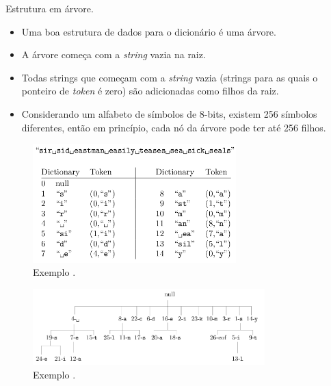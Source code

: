 \begin{frame}[allowframebreaks]
  \framebreak
  Estrutura em árvore.
  \begin{itemize}
  \item Uma boa estrutura de dados para o dicionário é uma árvore.
  \item A árvore começa com a \textit{string} vazia na raiz.
  \item Todas strings que começam com a \textit{string} vazia (strings para as quais o ponteiro de \textit{token} é zero) são adicionadas
        como filhos da raiz.
  \item Considerando um alfabeto de símbolos de 8-bits, existem 256 símbolos diferentes, então em princípio, cada nó
        da árvore pode ter até 256 filhos.
  \end{itemize} 

  \framebreak

  \begin{figure}[h!]
  \centering
  \includegraphics[width=0.7\textwidth]{images/lz78_example.png}
  \caption{Exemplo \citep{salomon2007}.}
  \label{fig:lz78_example}
  \end{figure}
 
  \framebreak

  \begin{figure}[h!]
  \centering
  \includegraphics[width=0.8\textwidth]{images/lz78_tree_example.png}
  \caption{Exemplo \citep{salomon2007}.}
  \label{fig:lz78_tree_example}
  \end{figure}

 
\end{frame}

